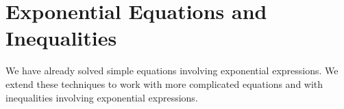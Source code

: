 \section{Exponential Equations and Inequalities}
We have already solved simple equations involving exponential expressions. We extend these techniques to work with more complicated equations and with inequalities involving exponential expressions.

 
 
 
% 
% 
 
 
